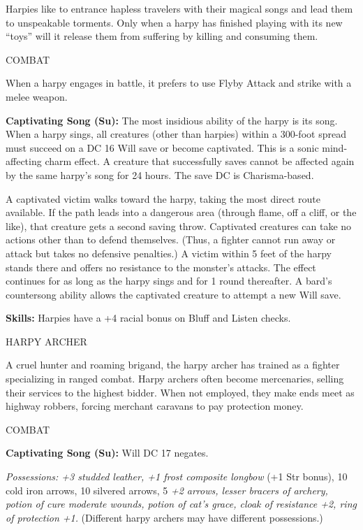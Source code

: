 \documentclass{article}
\begin{document}
Harpies like to entrance hapless travelers with their magical songs and lead them 
to unspeakable torments. Only when a harpy has finished playing with its new ``toys'' 
will it release them from suffering by killing and consuming them.

COMBAT

When a harpy engages in battle, it prefers to use Flyby Attack and strike with 
a melee weapon.

\textbf{Captivating Song (Su):} The most insidious ability of the harpy is its 
song. When a harpy sings, all creatures (other than harpies) within a 300-foot 
spread must succeed on a DC 16 Will save or become captivated. This is a sonic 
mind-affecting charm effect. A creature that successfully saves cannot be affected 
again by the same harpy's song for 24 hours. The save DC is Charisma-based. 

A captivated victim walks toward the harpy, taking the most direct route available. 
If the path leads into a dangerous area (through flame, off a cliff, or the like), 
that creature gets a second saving throw. Captivated creatures can take no actions 
other than to defend themselves. (Thus, a fighter cannot run away or attack but 
takes no defensive penalties.) A victim within 5 feet of the harpy stands there 
and offers no resistance to the monster's attacks. The effect continues for as 
long as the harpy sings and for 1 round thereafter. A bard's countersong ability 
allows the captivated creature to attempt a new Will save.

\textbf{Skills:} Harpies have a +4 racial bonus on Bluff and Listen checks.

\vspace{12pt}
HARPY ARCHER

A cruel hunter and roaming brigand, the harpy archer has trained as a fighter specializing 
in ranged combat. Harpy archers often become mercenaries, selling their services 
to the highest bidder. When not employed, they make ends meet as highway robbers, 
forcing merchant caravans to pay protection money.

COMBAT

\textbf{Captivating Song (Su):} Will DC 17 negates. 

\textit{Possessions: +3 studded leather, +1 frost composite longbow }(+1 Str bonus), 
10 cold iron arrows, 10 silvered arrows, 5 \textit{+2 arrows, lesser bracers of 
archery, potion of cure moderate wounds, potion of cat's grace, cloak of resistance 
+2, ring of protection +1. }(Different harpy archers may have different possessions.)
\end{document}
